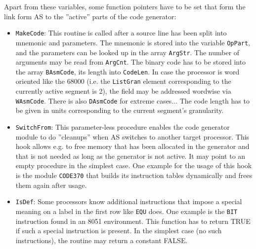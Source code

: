 \documentclass[12pt,twoside]{report}
\newcommand{\tty}[1]{{\tt #1}}
\begin{document}
Apart from these variables, some function pointers have to be set that
form the link form AS to the ''active'' parts of the code
generator:
\begin{itemize}
\item{\tty{MakeCode}: This routine is called after a source line has been
      split into mnemonic and parameters.  The mnemonic is stored into
      the variable \tty{OpPart}, and the parameters can be looked up in the
      array \tty{ArgStr}.  The number of arguments may be read from
      \tty{ArgCnt}.
      The binary code has to be stored into the array \tty{BAsmCode}, its
      length into \tty{CodeLen}.  In case the processor is word oriented
      like the 68000 (i.e. the \tty{ListGran} element corresponding to the
      currently active segment is 2), the field may be addressed
      wordwise via \tty{WAsmCode}.  There is also \tty{DAsmCode} for extreme
      cases... The code length has to be given in units corresponding
      to the current segment's granularity.}
\item{\tty{SwitchFrom}: This parameter-less procedure enables the code generator
      module to do ''cleanups'' when AS switches to another target processor.
      This hook allows e.g. to free memory that has been allocated in the
      generator and that is not needed as long as the generator is not
      active.  It may point to an empty procedure in the simplest case.
      One example for the usage of this hook is the module \tty{CODE370} that
      builds its instruction tables dynamically and frees them again after
      usage.}
\item{\tty{IsDef}: Some processors know additional instructions that impose
      a special meaning on a label in the first row like \tty{EQU} does.  One
      example is the \tty{BIT} instruction found in an 8051 environment.  This
      function has to return TRUE if such a special instruction is
      present.  In the simplest case (no such instructions), the routine
      may return a constant FALSE.}
\end{itemize}
\end{document}
